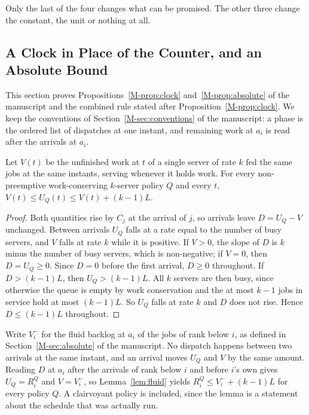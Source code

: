 \documentclass[mathematics,supfile,submit,moreauthors]{Definitions/mdpi}
\begin{document}
Only the last of the four changes what can be promised. The other three change the
constant, the unit or nothing at all.

\subsection{A Clock in Place of the Counter, and an Absolute Bound}
\label{sec:supp_clock}

This section proves Propositions~\ref*{M-prop:clock} and~\ref*{M-prop:absolute} of the manuscript and the combined rule stated
after Proposition~\ref*{M-prop:clock}. We keep the conventions of Section~\ref*{M-sec:conventions} of the manuscript: a phase
is the ordered list of dispatches at one instant, and remaining work at $a_i$ is read
after the arrivals at $a_i$.

\begin{lemma}
\label{lem:fluid}
Let $V(t)$ be the unfinished work at $t$ of a single server of rate $k$ fed the same
jobs at the same instants, serving whenever it holds work. For every non-preemptive
work-conserving $k$-server policy $Q$ and every $t$,
$V(t) \le U_Q(t) \le V(t) + (k-1)L$.
\end{lemma}

\begin{proof}
Both quantities rise by $C_j$ at the arrival of $j$, so arrivals leave
$D = U_Q - V$ unchanged. Between arrivals $U_Q$ falls at a rate equal to the number of
busy servers, and $V$ falls at rate $k$ while it is positive. If $V > 0$, the slope of $D$ is $k$ minus the number of
busy servers, which is non-negative; if $V = 0$, then $D = U_Q \ge 0$. Since $D = 0$
before the first arrival, $D \ge 0$ throughout. If $D > (k-1)L$, then
$U_Q > (k-1)L$. All $k$ servers are then busy, since otherwise the queue is empty by
work conservation and the at most $k-1$ jobs in service hold at most $(k-1)L$. So
$U_Q$ falls at rate $k$ and $D$ does not rise. Hence $D \le (k-1)L$ throughout.
\end{proof}

Write $V_i^-$ for the fluid backlog at $a_i$ of the jobs of rank below $i$, as defined
in Section~\ref*{M-sec:absolute} of the manuscript. No dispatch happens between two arrivals at the same
instant, and an arrival moves $U_Q$ and $V$ by the same amount. Reading $D$ at $a_i$
after the arrivals of rank below $i$ and before $i$'s own gives $U_Q = R^Q_i$ and
$V = V_i^-$, so Lemma~\ref{lem:fluid} yields $R^Q_i \le V_i^- + (k-1)L$ for every
policy $Q$. A clairvoyant policy is included, since the lemma is a statement about the
schedule that was actually run.
\end{document}
